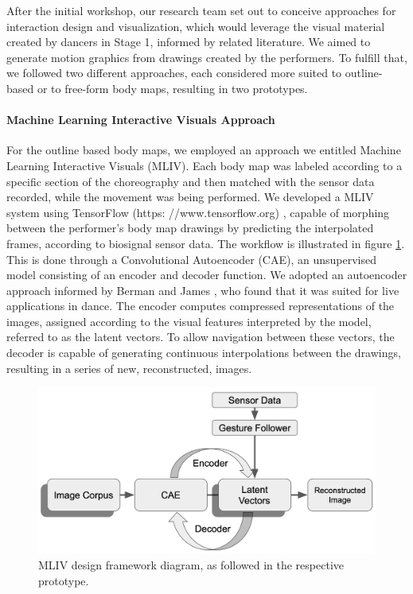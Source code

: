 After the initial workshop, our research team set out to conceive approaches for interaction design and visualization, which would leverage the visual material created by dancers in Stage 1, informed by related literature. We aimed to generate motion graphics from drawings created by the performers. To fulfill that, we followed two different approaches, each considered more suited to outline-based or to free-form body maps, resulting in two prototypes.

\paragraph{Machine Learning Interactive Visuals Approach}

For the outline based body maps, we employed an approach we entitled Machine Learning Interactive Visuals (MLIV). Each body map was labeled according to a specific section of the choreography and then matched with the sensor data recorded, while the movement was being performed. We developed a MLIV system using TensorFlow (https: //www.tensorflow.org) \cite{abadi_tensorflow_2016}, capable of morphing between the performer’s body map drawings by predicting the interpolated frames, according to biosignal sensor data. The workflow is illustrated in figure \ref{fig:ml-model}. This is done through a Convolutional Autoencoder (CAE), an unsupervised model consisting of an encoder and decoder function. We adopted an autoencoder approach informed by Berman and James \cite{liapis_learning_2018}, who found that it was suited for live applications in dance. The encoder computes compressed representations of the images, assigned according to the visual features interpreted by the model, referred to as the latent vectors. To allow navigation between these vectors, the decoder is capable of generating continuous interpolations between the drawings, resulting in a series of new, reconstructed, images.

\begin{figure}[ht]
  \centering
  \includegraphics[width=0.9\linewidth]{Chapters/Figures/modi_dis/ml-model.png}
  \caption{MLIV design framework diagram, as followed in the respective prototype.}
    \label{fig:ml-model}
\end{figure}

